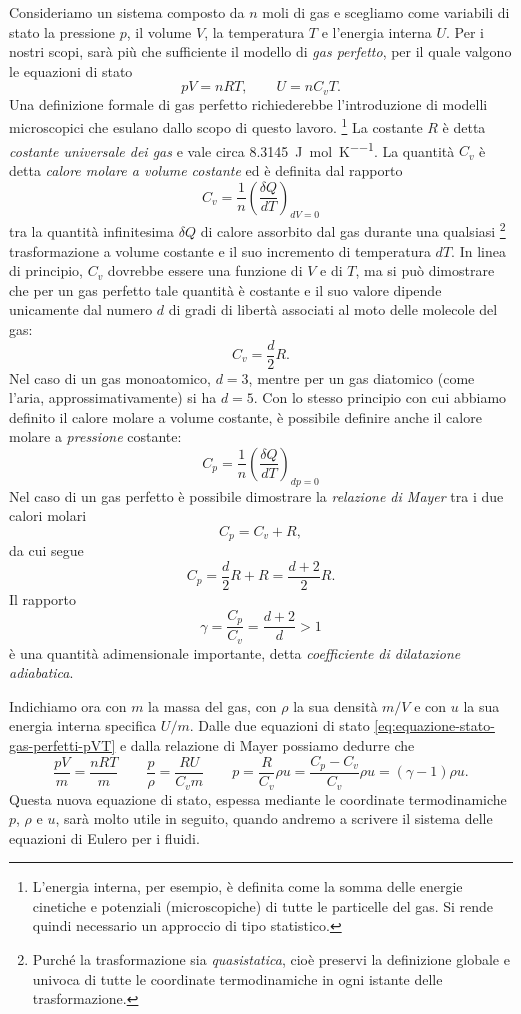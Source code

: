 Consideriamo un sistema composto da $n$ moli di gas
e scegliamo come variabili di stato la pressione $p$,
il volume $V$, la temperatura $T$ e l'energia interna $U$.
Per i nostri scopi, sarà più che sufficiente il modello di \emph{gas perfetto},
per il quale valgono le equazioni di stato 
\begin{equation} \label{eq:equazione-stato-gas-perfetti-pVT}
pV = nRT, \qquad U = n C_v T.
\end{equation}
Una definizione formale di gas perfetto richiederebbe l'introduzione
di modelli microscopici
che esulano dallo scopo di questo lavoro.%
\footnote{L'energia interna, per esempio, è definita come la somma
delle energie cinetiche e potenziali (microscopiche)
di tutte le particelle del gas. Si rende quindi necessario un approccio
di tipo statistico.}
La costante $R$ è detta \emph{costante universale dei gas}
e vale circa \SI{8,3145}{\joule\per\mol\per\kelvin}.
La quantità $C_v$ è detta \emph{calore molare a volume costante}
ed è definita dal rapporto
\[
C_v = \frac{1}{n} \left(\frac{\delta Q}{dT}\right)_{dV = 0}
\]
tra la quantità infinitesima $\delta Q$ di calore assorbito dal gas
durante una qualsiasi%
\footnote{Purché la trasformazione sia \emph{quasistatica},
cioè preservi la definizione globale e univoca di tutte
le coordinate termodinamiche in ogni istante delle trasformazione.}
trasformazione a volume costante
e il suo incremento di temperatura $dT$.
In linea di principio, $C_v$ dovrebbe essere una funzione di $V$ e
di $T$, ma si può dimostrare che per un gas perfetto tale quantità
è costante e il suo valore dipende unicamente dal numero $d$ di
gradi di libertà associati al moto delle molecole del gas:
\[
C_v = \frac{d}{2}R.
\]
Nel caso di un gas monoatomico, $d = 3$, mentre per un gas
diatomico (come l'aria, approssimativamente) si ha $d = 5$.
Con lo stesso principio con cui abbiamo definito il calore molare
a volume costante, è possibile definire anche il calore
molare a \emph{pressione} costante:
\[
C_p = \frac{1}{n} \left(\frac{\delta Q}{dT}\right)_{dp = 0}
\]
Nel caso di un gas perfetto è possibile dimostrare la \emph{relazione di Mayer}
tra i due calori molari
\[
C_p = C_v + R,
\]
da cui segue
\[
C_p = \frac{d}{2}R + R = \frac{d+2}{2}R.
\]
Il rapporto
\[
\gamma = \frac{C_p}{C_v} = \frac{d+2}{d} > 1
\]
è una quantità adimensionale importante,
detta \emph{coefficiente di dilatazione adiabatica}.

Indichiamo ora con $m$ la massa del gas, con $\rho$ la sua densità
$m/V$ e con $u$ la sua energia interna specifica $U/m$.
Dalle due equazioni di stato \eqref{eq:equazione-stato-gas-perfetti-pVT}
e dalla relazione di Mayer possiamo dedurre che
\begin{equation} \label{eq:equazione-stato-gas-perfetti-p-rho-u}
\frac{pV}{m} = \frac{nRT}{m} \qquad
\frac{p}{\rho} = \frac{RU}{C_v m} \qquad
p = \frac{R}{C_v} \rho u = \frac{C_p - C_v}{C_v} \rho u = (\gamma-1) \rho u.
\end{equation}
Questa nuova equazione di stato, espessa mediante le coordinate termodinamiche
$p$, $\rho$ e $u$, sarà molto utile in seguito, quando andremo a scrivere
il sistema delle equazioni di Eulero per i fluidi.

